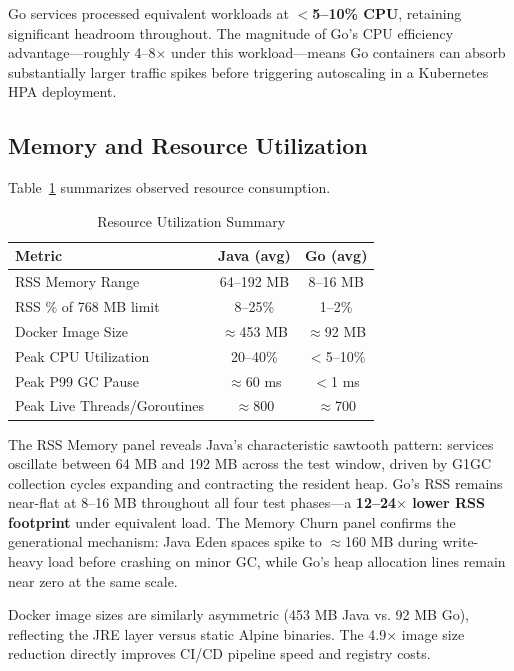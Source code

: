 \documentclass[conference]{IEEEtran}
\begin{document}
Go services processed equivalent workloads at \textbf{$<$5--10\% CPU}, retaining significant headroom throughout. The magnitude of Go's CPU efficiency advantage---roughly 4--8$\times$ under this workload---means Go containers can absorb substantially larger traffic spikes before triggering autoscaling in a Kubernetes HPA deployment.

\subsection{Memory and Resource Utilization}

Table~\ref{tab:resource_results} summarizes observed resource consumption.

\begin{table}[htbp]
\caption{Resource Utilization Summary}
\begin{center}
\begin{tabular}{|l|c|c|}
\hline
\textbf{Metric} & \textbf{Java (avg)} & \textbf{Go (avg)} \\
\hline
RSS Memory Range       & 64--192 MB  & 8--16 MB    \\
RSS \% of 768 MB limit & 8--25\%     & 1--2\%      \\
Docker Image Size      & $\approx$453 MB & $\approx$92 MB \\
Peak CPU Utilization   & 20--40\%    & $<$5--10\%  \\
Peak P99 GC Pause      & $\approx$60 ms & $<$1 ms    \\
Peak Live Threads/Goroutines & $\approx$800 & $\approx$700 \\
\hline
\end{tabular}
\label{tab:resource_results}
\end{center}
\end{table}

The RSS Memory panel reveals Java's characteristic sawtooth pattern: services oscillate between 64 MB and 192 MB across the test window, driven by G1GC collection cycles expanding and contracting the resident heap. Go's RSS remains near-flat at 8--16 MB throughout all four test phases---a \textbf{12--24$\times$ lower RSS footprint} under equivalent load. The Memory Churn panel confirms the generational mechanism: Java Eden spaces spike to $\approx$160 MB during write-heavy load before crashing on minor GC, while Go's heap allocation lines remain near zero at the same scale.

Docker image sizes are similarly asymmetric (453 MB Java vs. 92 MB Go), reflecting the JRE layer versus static Alpine binaries. The 4.9$\times$ image size reduction directly improves CI/CD pipeline speed and registry costs.
\end{document}
